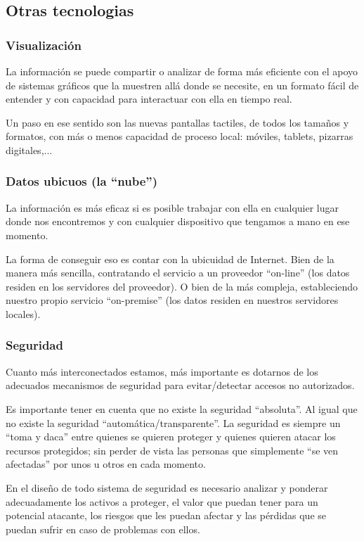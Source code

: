 \documentclass[spanish,12pt,a4paper,final,oneside]{book}
\begin{document}
\subsection{Otras tecnologias}

\subsubsection*{Visualización}
La información se puede compartir o analizar de forma más eficiente con el apoyo de sistemas gráficos que la muestren allá donde se necesite, en un formato fácil de entender y con capacidad para interactuar con ella en tiempo real.

Un paso en ese sentido son las nuevas pantallas tactiles, de todos los tamaños y formatos, con más o menos capacidad de proceso local: móviles, tablets, pizarras digitales,...

\subsubsection*{Datos ubicuos (la ``nube'')}
La información es más eficaz si es posible trabajar con ella en cualquier lugar donde nos encontremos y con cualquier dispositivo que tengamos a mano en ese momento.

La forma de conseguir eso es contar con la ubicuidad de Internet. Bien de la manera más sencilla, contratando el servicio a un proveedor ``on-line'' (los datos residen en los servidores del proveedor). O bien de la más compleja, estableciendo nuestro propio servicio ``on-premise'' (los datos residen en nuestros servidores locales).

\subsubsection*{Seguridad}
Cuanto más interconectados estamos, más importante es dotarnos de los adecuados mecanismos de seguridad para evitar/detectar accesos no autorizados.

Es importante tener en cuenta que no existe la seguridad ``absoluta''. Al igual que no existe la seguridad ``automática/transparente''. La seguridad es siempre un ``toma y daca'' entre quienes se quieren proteger y quienes quieren atacar los recursos protegidos; sin perder de vista las personas que simplemente ``se ven afectadas'' por unos u otros en cada momento.

En el diseño de todo sistema de seguridad es necesario analizar y ponderar adecuadamente los activos a proteger, el valor que puedan tener para un potencial atacante, los riesgos que les puedan afectar y las pérdidas que se puedan sufrir en caso de problemas con ellos.
\end{document}
